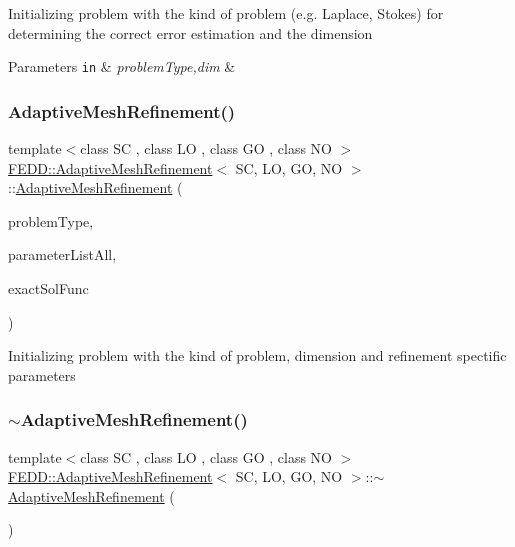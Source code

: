 Initializing problem with the kind of problem (e.\+g. Laplace, Stokes) for determining the correct error estimation and the dimension 
\begin{DoxyParams}[1]{Parameters}
\mbox{\tt in}  & {\em problem\+Type,dim} & \\
\hline
\end{DoxyParams}
\mbox{\label{classFEDD_1_1AdaptiveMeshRefinement_acf48e548d006ada2f7bec61fb2bc1d36}} 
\subsubsection{\texorpdfstring{Adaptive\+Mesh\+Refinement()}{AdaptiveMeshRefinement()}\hspace{0.1cm}{\footnotesize\ttfamily [3/3]}}
{\footnotesize\ttfamily template$<$class SC , class LO , class GO , class NO $>$ \\
\hyperlink{classFEDD_1_1AdaptiveMeshRefinement}{F\+E\+D\+D\+::\+Adaptive\+Mesh\+Refinement}$<$ SC, LO, GO, NO $>$\+::\hyperlink{classFEDD_1_1AdaptiveMeshRefinement}{Adaptive\+Mesh\+Refinement} (\begin{DoxyParamCaption}\item[{string}]{problem\+Type,  }\item[{Parameter\+List\+Ptr\+\_\+\+Type}]{parameter\+List\+All,  }\item[{Func\+\_\+\+Type}]{exact\+Sol\+Func }\end{DoxyParamCaption})}

Initializing problem with the kind of problem, dimension and refinement spectific parameters \mbox{\label{classFEDD_1_1AdaptiveMeshRefinement_ae9fa1b37f179d6d82c6e0b2bd8e898ec}} 
\subsubsection{\texorpdfstring{$\sim$\+Adaptive\+Mesh\+Refinement()}{~AdaptiveMeshRefinement()}}
{\footnotesize\ttfamily template$<$class SC , class LO , class GO , class NO $>$ \\
\hyperlink{classFEDD_1_1AdaptiveMeshRefinement}{F\+E\+D\+D\+::\+Adaptive\+Mesh\+Refinement}$<$ SC, LO, GO, NO $>$\+::$\sim$\hyperlink{classFEDD_1_1AdaptiveMeshRefinement}{Adaptive\+Mesh\+Refinement} (\begin{DoxyParamCaption}{ }\end{DoxyParamCaption})}



